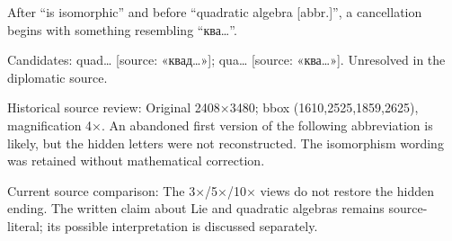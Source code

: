 After “is isomorphic” and before “quadratic algebra [abbr.]”, a cancellation begins with something resembling “ква…”.\par
Candidates: quad… [source: «квад…»]; qua… [source: «ква…»]. Unresolved in the diplomatic source.\par
Historical source review: Original 2408×3480; bbox (1610,2525,1859,2625), magnification 4×. An abandoned first version of the following abbreviation is likely, but the hidden letters were not reconstructed. The isomorphism wording was retained without mathematical correction.\par
Current source comparison: The 3×/5×/10× views do not restore the hidden ending. The written claim about Lie and quadratic algebras remains source-literal; its possible interpretation is discussed separately.\par\medskip
